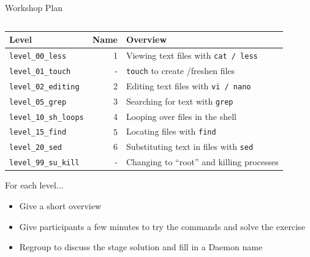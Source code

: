 \documentclass[mathserif]{beamer}
\begin{document}
\begin{frame}[label={sec:org965d302},fragile]{Workshop Plan}
 \vspace{-.2in}
\begin{columns}
\begin{column}{1.1\columnwidth}
\begin{block}{}
\begin{center}
\begin{tabular}{lrl}
\hline
Level & Name & Overview\\
\hline
\texttt{level\_00\_less} & 1 & Viewing text files with \texttt{cat / less}\\
\texttt{level\_01\_touch} & - & \texttt{touch} to create /freshen files\\
\texttt{level\_02\_editing} & 2 & Editing text files with \texttt{vi / nano}\\
\texttt{level\_05\_grep} & 3 & Searching for text with \texttt{grep}\\
\texttt{level\_10\_sh\_loops} & 4 & Looping over files in the shell\\
\texttt{level\_15\_find} & 5 & Locating files with \texttt{find}\\
\texttt{level\_20\_sed} & 6 & Substituting text in files with \texttt{sed}\\
\texttt{level\_99\_su\_kill} & - & Changing to ``root'' and killing processes\\
\hline
\end{tabular}
\end{center}

For each level...
\begin{itemize}
\item Give a short overview
\item Give participants a few minutes to try the commands and solve the exercise
\item Regroup to discuss the stage solution and fill in a Daemon name
\end{itemize}
\end{block}
\end{column}
\end{columns}
\end{frame}
\end{document}
